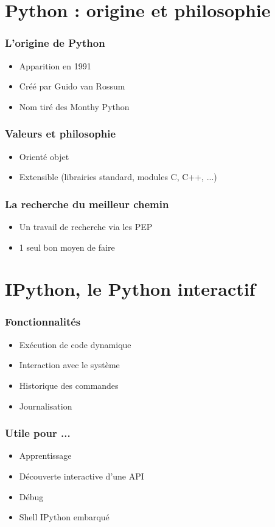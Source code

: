 \section{Python : origine et philosophie}

\begin{frame}
  \frametitle{L'origine de Python}
  \begin{itemize}
    \item<1-> Apparition en 1991
    \item<2-> Créé par Guido van Rossum
    \item<3-> Nom tiré des Monthy Python
  \end{itemize}
\end{frame}

\begin{frame}
\frametitle{Valeurs et philosophie}
  \begin{itemize}
    \item<1-> Orienté objet
    \item<2-> Extensible (librairies standard, modules C, C++, ...)
  \end{itemize}
\end{frame}

\begin{frame}
\frametitle{La recherche du meilleur chemin}
  \begin{itemize}
    \item<1-> Un travail de recherche via les PEP
    \item<2-> 1 seul bon moyen de faire
  \end{itemize}
\end{frame}



\section{IPython, le Python interactif}

\begin{frame}
  \frametitle{Fonctionnalités}
  \begin{itemize}
    \item Exécution de code dynamique
    \item Interaction avec le système
    \item Historique des commandes
    \item Journalisation 
  \end{itemize}
\end{frame}

\begin{frame}
\frametitle{Utile pour ...}
  \begin{itemize}
    \item Apprentissage
    \item Découverte interactive d'une API
    \item Débug
    \item Shell IPython embarqué
  \end{itemize}
\end{frame}


